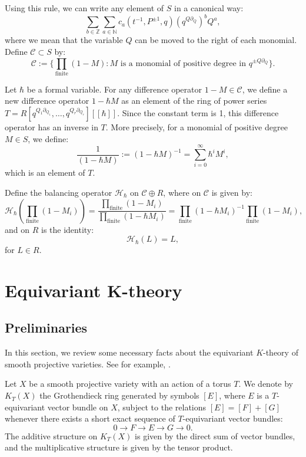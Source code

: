 \documentclass{amsart}
\begin{document}
        Using this rule, we can write any element of $S$ in a canonical way:
        \[
        \sum_{b \in \mathbb{Z}}\sum_{a \in \mathbb{N}} c_a(t^{-1}, P^{\pm 1},q)(q^{Q \partial_{Q}})^{b}Q^a,
        \]
        where we mean that the variable $Q$ can be moved to the right of each monomial.
        Define $\mathcal{C} \subset S$
        by:
        \[
        \mathcal{C}:=\{\prod_{\text{finite}}(1-M): \text{$M$ is a monomial of positive degree in $q^{\pm Q \partial_{Q}}$}\}.
        \]
         
       Let $\hbar$ be a formal variable. For any difference operator $1-M \in \mathcal{C}$, we define a new difference operator $1-\hbar M$ as an element of the ring of power series $T=R[q^{Q_1 \partial_{Q_1}},\dots,q^{Q_r \partial_{Q_r}}][[\hbar]]$. Since the constant term is 1, this difference operator has an inverse in $T$. More precisely, for a monomial of positive degree $M \in S$, we define:
       \[
       \frac{1}{(1-\hbar M)}:=(1-\hbar M)^{-1} = \sum_{i=0}^{\infty}\hbar^{i}M^i,
       \]
       which is an element of $T$.
       
       Define the balancing operator $\mathcal{H}_{\hbar}$ on $\mathcal{C} \oplus R$, where on $\mathcal{C}$ is given by:
       \begin{equation}\label{H-operator}
          \mathcal{H}_{\hbar}\left(\prod_{\text{finite}}(1-M_i)\right) = \frac{\prod_{\text{finite}}(1-M_i)}{\prod_{\text{finite}}(1-\hbar M_i)} = \prod_{\text{finite}}(1-\hbar M_i)^{-1}\prod_{\text{finite}}(1-M_i) ,
       \end{equation}
       and on $R$ is the identity:
       \[
       \mathcal{H}_{\hbar}(L) = L,
       \]
       for $L \in R$. 

 
\section{Equivariant K-theory}
\subsection{Preliminaries}
In this section, we review some necessary facts about the equivariant $K$-theory of smooth projective varieties. See for example, \cite{NIE, CG}.

Let $X$ be a smooth projective variety with an action of a torus $T$. We denote by $K_T(X)$ the Grothendieck ring generated by symbols $[E]$, where
$E$ is a $T$-equivariant vector bundle on $X$, subject to the relations $[E] = [F] + [G]$ whenever there exists a short exact sequence of $T$-equivariant vector bundles:  
\[
0 \to F \to E \to G \to 0.
\]
The additive structure on $K_T(X)$ is given by the direct sum of vector bundles, and the multiplicative structure is given by the tensor product.
\end{document}
